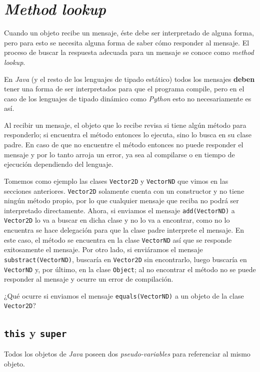 \section{\textit{Method lookup}}
  \label{sec:lookup}

  Cuando un objeto recibe un mensaje, éste debe ser interpretado de alguna forma, pero para esto se 
  necesita alguna forma de saber cómo responder al mensaje.
  El proceso de buscar la respuesta adecuada para un mensaje se conoce como \textit{method lookup}.

  En \textit{Java} (y el resto de los lenguajes de tipado estático) todos los mensajes 
  \textbf{deben} tener una forma de ser interpretados para que el programa compile, pero en el caso
  de los lenguajes de tipado dinámico como \textit{Python} esto no necesariamente es así.

  Al recibir un mensaje, el objeto que lo recibe revisa si tiene algún método para responderlo; si
  encuentra el método entonces lo ejecuta, sino lo busca en su clase padre.
  En caso de que no encuentre el método entonces no puede responder el mensaje y por lo tanto arroja
  un error, ya sea al compilarse o en tiempo de ejecución dependiendo del lenguaje.

  Tomemos como ejemplo las clases \texttt{Vector2D} y \texttt{VectorND} que vimos en las secciones
  anteriores.
  \texttt{Vector2D} solamente cuenta con un constructor y no tiene ningún método propio, por lo que
  cualquier mensaje que reciba no podrá ser interpretado directamente.
  Ahora, si enviamos el mensaje \texttt{add(VectorND)} a \texttt{Vector2D} lo va a buscar en dicha 
  clase y no lo va a encontrar, como no lo encuentra se hace delegación\autocite{wp-delegation} para
  que la clase padre interprete el mensaje.
  En este caso, el método se encuentra en la clase \texttt{VectorND} así que se responde
  exitosamente el mensaje.
  Por otro lado, si enviáramos el mensaje \texttt{substract(VectorND)}, buscaría en 
  \texttt{Vector2D} sin encontrarlo, luego buscaría en \texttt{VectorND} y, por último, en la clase
  \texttt{Object}; al no encontrar el método no se puede responder al mensaje y ocurre un error de
  compilación.

  \begin{exercise}
    ¿Qué ocurre si enviamos el mensaje \texttt{equals(VectorND)} a un objeto de la clase 
    \texttt{Vector2D}?
  \end{exercise}


  \subsection{\texttt{this} y \texttt{super}}
    Todos los objetos de \textit{Java} poseen dos \textit{pseudo-variables} para referenciar al 
    mismo objeto.
